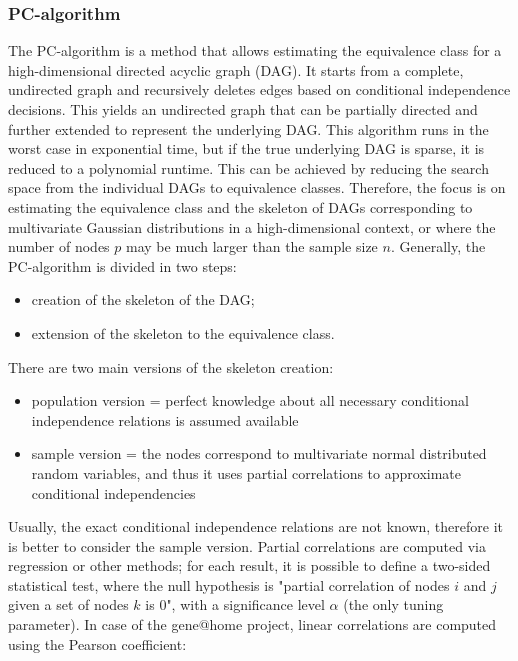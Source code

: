 \documentclass[journal]{IEEEtran}
\begin{document}
\subsubsection{PC-algorithm}
The PC-algorithm is a method that allows estimating the equivalence class for a high-dimensional directed acyclic graph (DAG). It starts from a complete, undirected graph and recursively deletes edges based on conditional independence decisions. This yields an undirected graph that can be partially directed and further extended to represent the underlying DAG. This algorithm runs in the worst case in exponential time, but if the true underlying DAG is sparse, it is reduced to a polynomial runtime. This can be achieved by reducing the search space from the individual DAGs to equivalence classes. Therefore, the focus is on estimating the equivalence class and the skeleton of DAGs corresponding to multivariate Gaussian distributions in a high-dimensional context, or where the number of nodes $p$ may be much larger than the sample size $n$.
Generally, the PC-algorithm is divided in two steps:
\begin{itemize}
    \item creation of the skeleton of the DAG;
    \item extension of the skeleton to the equivalence class.
\end{itemize}
There are two main versions of the skeleton creation:
\begin{itemize}
    \item population version = perfect knowledge about all necessary conditional independence relations is assumed available
    \item sample version = the nodes correspond to multivariate normal distributed random variables, and thus it uses partial correlations to approximate conditional independencies
\end{itemize}
Usually, the exact conditional independence relations are not known, therefore it is better to consider the sample version. Partial correlations are computed via regression or other methods; for each result, it is possible to define a two-sided statistical test, where the null hypothesis is "partial correlation of nodes $i$ and $j$ given a set of nodes $k$ is 0", with a significance level $\alpha$ (the only tuning parameter). In case of the gene@home project, linear correlations are computed using the Pearson coefficient:
\end{document}
